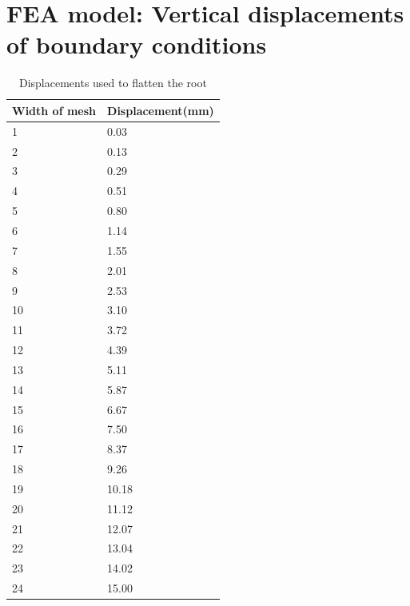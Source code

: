\newpage
\appendix
\section{FEA model: Vertical displacements of boundary conditions}
\begin{table}[!hbt]
\centering
\begin{tabular}{|l|l|}
\hline
\textbf{Width of mesh} & \textbf{Displacement(mm)} \\ \hline
1 & 0.03 \\ \hline
2 & 0.13 \\ \hline
3 & 0.29 \\ \hline
4 & 0.51 \\ \hline
5 & 0.80 \\ \hline
6 & 1.14 \\ \hline
7 & 1.55 \\ \hline
8 & 2.01 \\ \hline
9 & 2.53 \\ \hline
10 & 3.10 \\ \hline
11 & 3.72 \\ \hline
12 & 4.39 \\ \hline
13 & 5.11 \\ \hline
14 & 5.87 \\ \hline
15 & 6.67 \\ \hline
16 & 7.50 \\ \hline
17 & 8.37 \\ \hline
18 & 9.26 \\ \hline
19 & 10.18 \\ \hline
20 & 11.12 \\ \hline
21 & 12.07 \\ \hline
22 & 13.04 \\ \hline
23 & 14.02 \\ \hline
24 & 15.00 \\ \hline
\end{tabular}
\caption{Displacements used to flatten the root}
\label{tab:disp}
\end{table}

